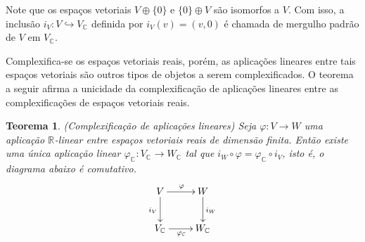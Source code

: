 \documentclass[12pt]{book}
\newtheorem{teorema}{Teorema}[section]
\newcommand{\complexificacao}[1]{#1_{\complexo{}}}
\newcommand{\complexo}[1]{\mathbb{C}^{#1}}
\newcommand{\real}[1]{\mathbb{R}^{#1}}
\newcommand{\reta}{\real{}}
\begin{document}
	Note que os espaços vetoriais $V\oplus\{0\}$ e $\{0\}\oplus V$ são isomorfos a $V$. Com isso, a inclusão $i_{V} :V \hookrightarrow \complexificacao{V}$ definida por $i_{V}(v) = (v, 0)$ é chamada de mergulho padrão de $V$ em $\complexificacao{V}$.
	
	Complexifica-se os espaços vetoriais reais, porém, as aplicações lineares entre tais espaços vetoriais são outros tipos de objetos a serem complexificados. O teorema a seguir afirma a unicidade da complexificação de aplicações lineares entre as complexificações de espaços vetoriais reais.
	
	\begin{teorema}
		(Complexificação de aplicações lineares) Seja $\varphi : V \to W$ uma aplicação
		$\reta$-linear entre espaços vetoriais reais de dimensão finita. Então existe uma única aplicação linear $\complexificacao{\varphi}:\complexificacao{V} \to \complexificacao{W}$ tal que $i_{W}\circ \varphi = \complexificacao{\varphi} \circ i_{V}$, isto é, o diagrama abaixo é comutativo.
		$$
		\xymatrix{
			V\ar[d]_{i_{V}}\ar[r]^{\varphi} & W\ar[d]^{i_{W}} 
			\\
			\complexificacao{V} \ar[r]_{\complexificacao{\varphi}}&\complexificacao{W} 
		}
		$$
	\end{teorema}
\end{document}
